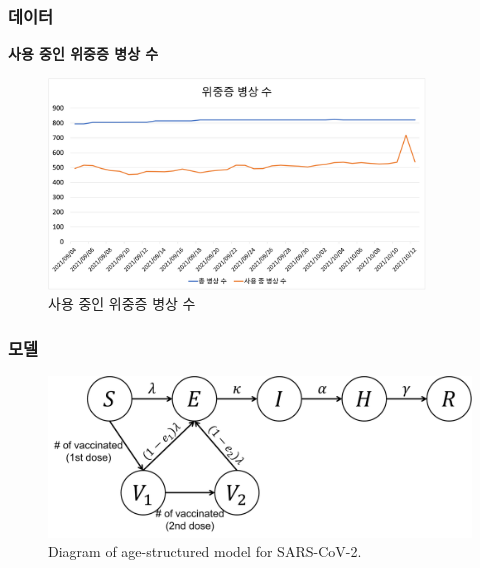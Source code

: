 \documentclass[aspectratio=169, 9pt, xcolor=dvipsnames]{beamer}
\begin{document}
	\begin{frame}\frametitle{데이터}
		\textbf{사용 중인 위중증 병상 수}
	    \begin{figure}
	    	\includegraphics[width=10cm]{beds.png}
	    	\caption{사용 중인 위중증 병상 수}
	    \end{figure}
	\end{frame}

	\begin{frame}\frametitle{모델}
	    \begin{figure}
	    	\centering
	    	\includegraphics[width=12cm]{diagram.pdf}
	    	\caption{Diagram of age-structured model for SARS-CoV-2.}
	    \end{figure}
	\end{frame}
\end{document}
